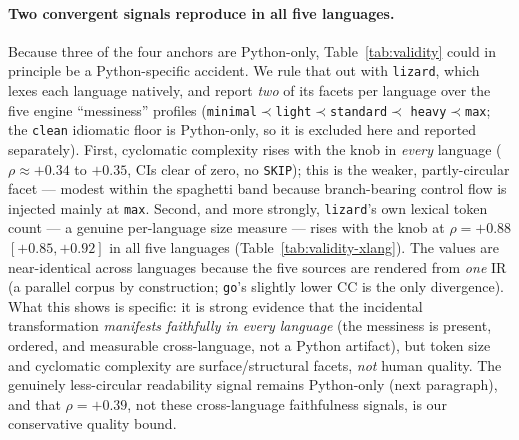 \paragraph{Two convergent signals reproduce in all five languages.}
Because three of the four anchors are Python-only, Table~\ref{tab:validity} could in
principle be a Python-specific accident. We rule that out with \texttt{lizard}, which
lexes each language natively, and report \emph{two} of its facets per language over the
five engine ``messiness'' profiles
(\texttt{minimal}${}\prec{}$\texttt{light}${}\prec{}$\texttt{standard}${}\prec{}$%
\texttt{heavy}${}\prec{}$\texttt{max}; the \texttt{clean} idiomatic floor is Python-only,
so it is excluded here and reported separately). First, cyclomatic complexity rises with
the knob in \emph{every} language ($\rho\approx+0.34$ to $+0.35$, CIs clear of zero, no
\texttt{SKIP}); this is the weaker, partly-circular facet --- modest within the spaghetti
band because branch-bearing control flow is injected mainly at \texttt{max}. Second, and
more strongly, \texttt{lizard}'s own lexical token count --- a genuine per-language size
measure --- rises with the knob at $\rho=+0.88$ $[+0.85,+0.92]$ in all five languages
(Table~\ref{tab:validity-xlang}). The values are near-identical across languages because
the five sources are rendered from \emph{one} IR (a parallel corpus by construction;
\texttt{go}'s slightly lower CC is the only divergence). What this shows is specific: it is strong evidence that the incidental transformation
\emph{manifests faithfully in every language} (the messiness is present, ordered, and
measurable cross-language, not a Python artifact), but token size and cyclomatic
complexity are surface/structural facets, \emph{not} human quality. The
genuinely less-circular readability signal remains Python-only (next paragraph), and that
$\rho=+0.39$, not these cross-language faithfulness signals, is our conservative quality
bound.

